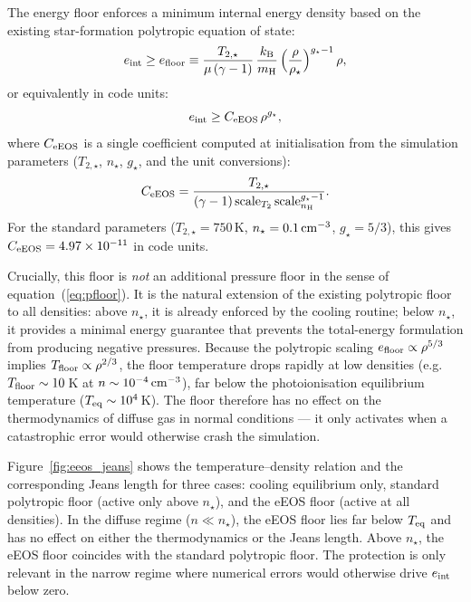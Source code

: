 \documentclass[fleqn,usenatbib]{mnras}
\newcommand{\nstar}{n_\star}
\newcommand{\Tstar}{T_{2,\star}}
\newcommand{\gstar}{g_\star}
\begin{document}
The energy floor enforces a minimum internal energy density based on
the existing star-formation polytropic equation of state:
\begin{equation}
  e_{\rm int} \ge e_{\rm floor} \equiv
  \frac{\Tstar}{\mu\,(\gamma-1)}\,
  \frac{k_{\rm B}}{m_{\rm H}}\,
  \Bigl(\frac{\rho}{\rho_\star}\Bigr)^{\gstar - 1}\,\rho,
  \label{eq:eeos_floor}
\end{equation}
or equivalently in code units:
\begin{equation}
  e_{\rm int} \ge C_{\rm eEOS}\,\rho^{\gstar},
  \label{eq:eeos_code}
\end{equation}
where $C_{\rm eEOS}$ is a single coefficient computed at initialisation
from the simulation parameters ($\Tstar$, $\nstar$, $\gstar$, and the
unit conversions):
\begin{equation}
  C_{\rm eEOS} = \frac{\Tstar}{(\gamma-1)\,
  \text{scale}_{T_2}\,\text{scale}_{n_{\rm H}}^{\gstar-1}}.
  \label{eq:eeos_coeff}
\end{equation}
For the standard parameters ($\Tstar = 750\,$K, $\nstar = 0.1\,
{\rm cm}^{-3}$, $\gstar = 5/3$), this gives $C_{\rm eEOS} = 4.97
\times 10^{-11}$ in code units.

Crucially, this floor is \emph{not} an additional pressure floor in
the sense of equation~(\ref{eq:pfloor}).  It is the natural extension
of the existing polytropic floor to all densities: above $\nstar$, it
is already enforced by the cooling routine; below $\nstar$, it
provides a minimal energy guarantee that prevents the total-energy
formulation from producing negative pressures.  Because the polytropic
scaling $e_{\rm floor} \propto \rho^{5/3}$ implies $T_{\rm floor}
\propto \rho^{2/3}$, the floor temperature drops rapidly at low
densities (e.g.\ $T_{\rm floor} \sim 10\,$K at $n \sim 10^{-4}\,
{\rm cm}^{-3}$), far below the photoionisation equilibrium temperature
($T_{\rm eq} \sim 10^4\,$K).  The floor therefore has no effect on the
thermodynamics of diffuse gas in normal conditions --- it only
activates when a catastrophic error would otherwise crash the
simulation.

Figure~\ref{fig:eeos_jeans} shows the temperature--density relation
and the corresponding Jeans length for three cases: cooling equilibrium
only, standard polytropic floor (active only above $\nstar$), and the
eEOS floor (active at all densities).  In the diffuse regime
($n \ll \nstar$), the eEOS floor lies far below $T_{\rm eq}$ and has
no effect on either the thermodynamics or the Jeans length.  Above
$\nstar$, the eEOS floor coincides with the standard polytropic floor.
The protection is only relevant in the narrow regime where numerical
errors would otherwise drive $e_{\rm int}$ below zero.
\end{document}

